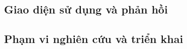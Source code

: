 \par{}
\subsection{Giao diện sử dụng và phản hồi}\label{subsection:architecture-8}

\par{}
\subsection{Phạm vi nghiên cứu và triển khai}\label{subsection:architecture-9}

